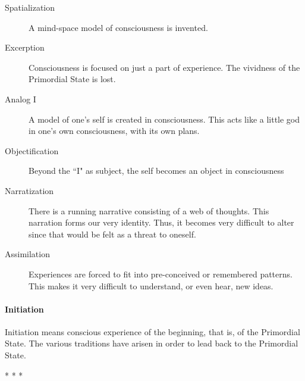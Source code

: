 \begin{description}
\item[Spatialization ]

A mind-space model of consciousness is invented. 

\item[Excerption ]

Consciousness is focused on just a part of experience. The vividness of the Primordial State is lost. 

\item[Analog I ]

A model of one's self is created in consciousness. This acts like a little god in one's own consciousness, with its own plans. 

\item[Objectification ]

Beyond the ``I" as subject, the self becomes an object in consciousness 

\item[Narratization ]

There is a running narrative consisting of a web of thoughts. This narration forms our very identity. Thus, it becomes very difficult to alter since that would be felt as a threat to oneself. 

\item[Assimilation ]

Experiences are forced to fit into pre-conceived or remembered patterns. This makes it very difficult to understand, or even hear, new ideas. 

\end{description}
\paragraph{Initiation}
Initiation means conscious experience of the beginning, that is, of the Primordial State. The various traditions have arisen in order to lead back to the Primordial State.


\begin{center}* * *\end{center}

